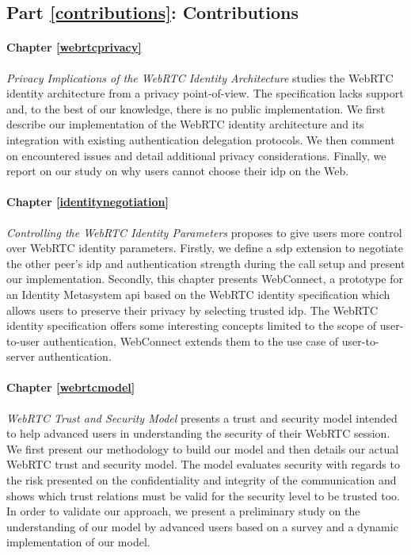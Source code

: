 \subsection*{Part \ref{contributions}: Contributions}
\paragraph{Chapter \ref{webrtcprivacy}} \textit{Privacy Implications of the WebRTC Identity Architecture} studies the WebRTC identity architecture from a privacy point-of-view.
The specification lacks support and, to the best of our knowledge, there is no public implementation.
We first describe our implementation of the WebRTC identity architecture and its integration with existing authentication delegation protocols.
We then comment on encountered issues and detail additional privacy considerations.
Finally, we report on our study on why users cannot choose their \gls{idp} on the Web. 


\paragraph{Chapter \ref{identitynegotiation}} \textit{Controlling the WebRTC Identity Parameters} proposes to give users more control over WebRTC identity parameters.
Firstly, we define a \gls{sdp} extension to negotiate the other peer's \gls{idp} and authentication strength during the call setup and present our implementation.
Secondly, this chapter presents WebConnect, a prototype for an Identity Metasystem \gls{api} based on the WebRTC identity specification which allows users to preserve their privacy by selecting trusted \gls{idp}.
The WebRTC identity specification offers some interesting concepts limited to the scope of user-to-user authentication, WebConnect extends them to the use case of user-to-server authentication.


\paragraph{Chapter \ref{webrtcmodel}} \textit{WebRTC Trust and Security Model} presents a trust and security model intended to help advanced users in understanding the security of their WebRTC session.
We first present our methodology to build our model and then details our actual WebRTC trust and security model.
The model evaluates security with regards to the risk presented on the confidentiality and integrity of the communication and shows which trust relations must be valid for the security level to be trusted too. 
In order to validate our approach, we present a preliminary study on the understanding of our model by advanced users based on a survey and a dynamic implementation of our model.


